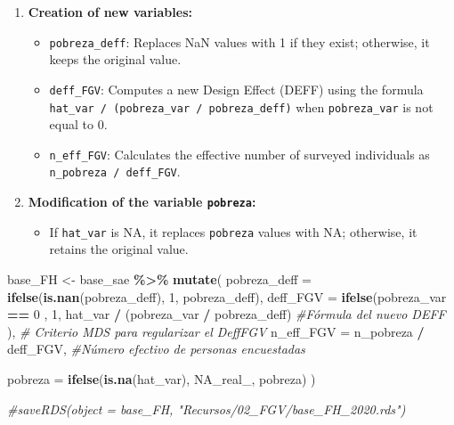 \documentclass[
  12pt,
]{book}
\newenvironment{Shaded}{\begin{snugshade}}{\end{snugshade}}
\newcommand{\AttributeTok}[1]{\textcolor[rgb]{0.13,0.29,0.53}{#1}}
\newcommand{\CommentTok}[1]{\textcolor[rgb]{0.56,0.35,0.01}{\textit{#1}}}
\newcommand{\ConstantTok}[1]{\textcolor[rgb]{0.56,0.35,0.01}{#1}}
\newcommand{\DecValTok}[1]{\textcolor[rgb]{0.00,0.00,0.81}{#1}}
\newcommand{\FunctionTok}[1]{\textcolor[rgb]{0.13,0.29,0.53}{\textbf{#1}}}
\newcommand{\NormalTok}[1]{#1}
\newcommand{\OtherTok}[1]{\textcolor[rgb]{0.56,0.35,0.01}{#1}}
\newcommand{\SpecialCharTok}[1]{\textcolor[rgb]{0.81,0.36,0.00}{\textbf{#1}}}
\providecommand{\tightlist}{%
  \setlength{\itemsep}{0pt}\setlength{\parskip}{0pt}}
\begin{document}
\begin{enumerate}
\def\labelenumi{\arabic{enumi}.}
\tightlist
\item
  \textbf{Creation of new variables:}

  \begin{itemize}
  \tightlist
  \item
    \texttt{pobreza\_deff}: Replaces NaN values with 1 if they exist; otherwise, it keeps the original value.
  \item
    \texttt{deff\_FGV}: Computes a new Design Effect (DEFF) using the formula \texttt{hat\_var\ /\ (pobreza\_var\ /\ pobreza\_deff)} when \texttt{pobreza\_var} is not equal to 0.
  \item
    \texttt{n\_eff\_FGV}: Calculates the effective number of surveyed individuals as \texttt{n\_pobreza\ /\ deff\_FGV}.
  \end{itemize}
\item
  \textbf{Modification of the variable \texttt{pobreza}:}

  \begin{itemize}
  \tightlist
  \item
    If \texttt{hat\_var} is NA, it replaces \texttt{pobreza} values with NA; otherwise, it retains the original value.
  \end{itemize}
\end{enumerate}

\begin{Shaded}
\begin{Highlighting}[]
\NormalTok{base\_FH }\OtherTok{\textless{}{-}}\NormalTok{ base\_sae }\SpecialCharTok{\%\textgreater{}\%}
  \FunctionTok{mutate}\NormalTok{(}
    \AttributeTok{pobreza\_deff =} \FunctionTok{ifelse}\NormalTok{(}\FunctionTok{is.nan}\NormalTok{(pobreza\_deff), }\DecValTok{1}\NormalTok{, pobreza\_deff),}
    \AttributeTok{deff\_FGV =} \FunctionTok{ifelse}\NormalTok{(pobreza\_var }\SpecialCharTok{==} \DecValTok{0}\NormalTok{ ,}
      \DecValTok{1}\NormalTok{,}
\NormalTok{      hat\_var }\SpecialCharTok{/}\NormalTok{ (pobreza\_var }\SpecialCharTok{/}\NormalTok{ pobreza\_deff) }\CommentTok{\#Fórmula del nuevo DEFF}
\NormalTok{    ),}
    \CommentTok{\# Criterio MDS para regularizar el DeffFGV}
    \AttributeTok{n\_eff\_FGV =}\NormalTok{ n\_pobreza }\SpecialCharTok{/}\NormalTok{ deff\_FGV, }\CommentTok{\#Número efectivo de personas encuestadas}

     \AttributeTok{pobreza =} \FunctionTok{ifelse}\NormalTok{(}\FunctionTok{is.na}\NormalTok{(hat\_var), }\ConstantTok{NA\_real\_}\NormalTok{, pobreza) }
\NormalTok{  )}


\CommentTok{\#saveRDS(object = base\_FH, "Recursos/02\_FGV/base\_FH\_2020.rds")}
\end{Highlighting}
\end{Shaded}
\end{document}
